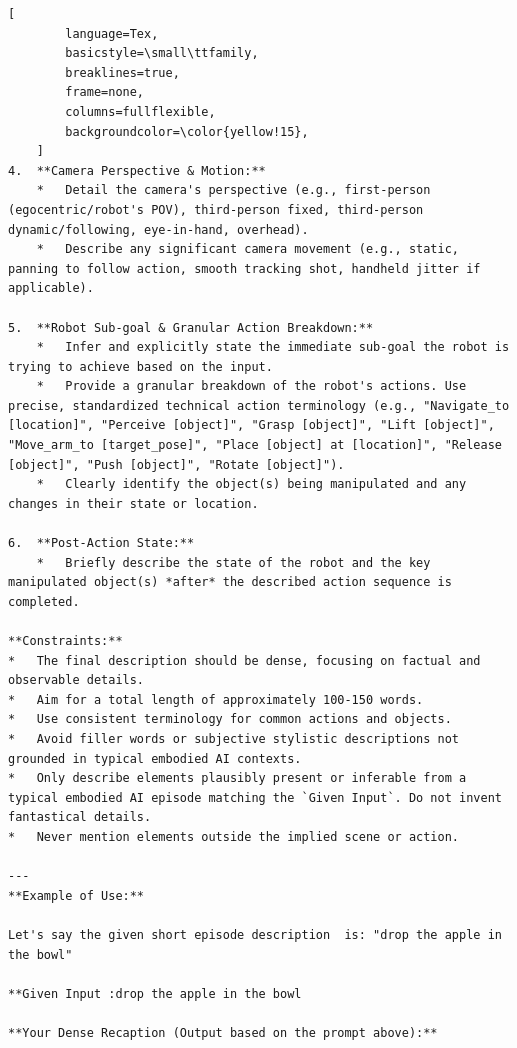 \begin{tcolorbox}[
    promptstyle, 
    width=\linewidth, 
    breakable
]
\begin{lstlisting}[
        language=Tex, 
        basicstyle=\small\ttfamily,
        breaklines=true,
        frame=none, 
        columns=fullflexible,
        backgroundcolor=\color{yellow!15}, 
    ]
4.  **Camera Perspective & Motion:**
    *   Detail the camera's perspective (e.g., first-person (egocentric/robot's POV), third-person fixed, third-person dynamic/following, eye-in-hand, overhead).
    *   Describe any significant camera movement (e.g., static, panning to follow action, smooth tracking shot, handheld jitter if applicable).

5.  **Robot Sub-goal & Granular Action Breakdown:**
    *   Infer and explicitly state the immediate sub-goal the robot is trying to achieve based on the input.
    *   Provide a granular breakdown of the robot's actions. Use precise, standardized technical action terminology (e.g., "Navigate_to [location]", "Perceive [object]", "Grasp [object]", "Lift [object]", "Move_arm_to [target_pose]", "Place [object] at [location]", "Release [object]", "Push [object]", "Rotate [object]").
    *   Clearly identify the object(s) being manipulated and any changes in their state or location.

6.  **Post-Action State:**
    *   Briefly describe the state of the robot and the key manipulated object(s) *after* the described action sequence is completed.

**Constraints:**
*   The final description should be dense, focusing on factual and observable details.
*   Aim for a total length of approximately 100-150 words.
*   Use consistent terminology for common actions and objects.
*   Avoid filler words or subjective stylistic descriptions not grounded in typical embodied AI contexts.
*   Only describe elements plausibly present or inferable from a typical embodied AI episode matching the `Given Input`. Do not invent fantastical details.
*   Never mention elements outside the implied scene or action.

---
**Example of Use:**

Let's say the given short episode description  is: "drop the apple in the bowl"

**Given Input :drop the apple in the bowl

**Your Dense Recaption (Output based on the prompt above):**


\end{lstlisting}
\end{tcolorbox}
